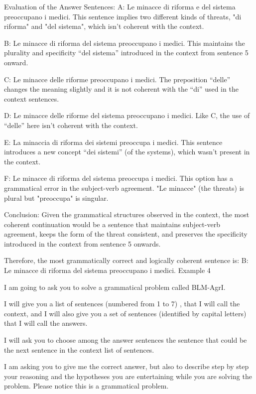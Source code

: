 Evaluation of the Answer Sentences:
A: Le minacce di riforma e del sistema preoccupano i medici.
This sentence implies two different kinds of threats, "di riforma" and "del sistema", which isn’t coherent with the context.

B: Le minacce di riforma del sistema preoccupano i medici.
This maintains the plurality and specificity “del sistema” introduced in the context from sentence 5 onward.

C: Le minacce delle riforme preoccupano i medici.
The preposition “delle” changes the meaning slightly and it is not coherent with the “di” used in the context sentences.

D: Le minacce delle riforme del sistema preoccupano i medici.
Like C, the use of “delle” here isn’t coherent with the context.

E: La minaccia di riforma dei sistemi preoccupa i medici.
This sentence introduces a new concept “dei sistemi” (of the systems), which wasn’t present in the context.

F: Le minacce di riforma del sistema preoccupa i medici.
This option has a grammatical error in the subject-verb agreement. "Le minacce" (the threats) is plural but "preoccupa" is singular.

Conclusion:
Given the grammatical structures observed in the context, the most coherent continuation would be a sentence that maintains subject-verb agreement, keeps the form of the threat consistent, and preserves the specificity introduced in the context from sentence 5 onwards.

Therefore, the most grammatically correct and logically coherent sentence is:
B: Le minacce di riforma del sistema preoccupano i medici.
Example 4

I am going to ask you to solve a grammatical problem called BLM-AgrI.  

I will give you a list of sentences (numbered from 1 to 7) , that I will call the context, and I will also give you a set of sentences (identified by capital letters) that I will call  the answers. 

I will ask you to choose among the answer sentences the sentence that could be the next sentence in the context list of sentences.

I am asking you to give me the correct answer, but also to describe step by step  your reasoning and the hypotheses you are entertaining while you are solving the problem. Please notice this is a grammatical problem.

